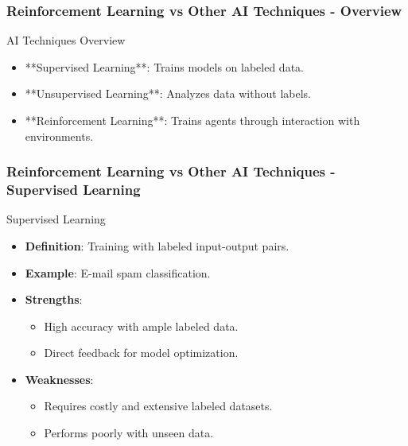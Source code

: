 \documentclass{beamer}
\begin{document}
\begin{frame}[fragile]
    \frametitle{Reinforcement Learning vs Other AI Techniques - Overview}
    \begin{block}{AI Techniques Overview}
        \begin{itemize}
            \item **Supervised Learning**: Trains models on labeled data.
            \item **Unsupervised Learning**: Analyzes data without labels.
            \item **Reinforcement Learning**: Trains agents through interaction with environments.
        \end{itemize}
    \end{block}
\end{frame}

\begin{frame}[fragile]
    \frametitle{Reinforcement Learning vs Other AI Techniques - Supervised Learning}
    \begin{block}{Supervised Learning}
        \begin{itemize}
            \item \textbf{Definition}: Training with labeled input-output pairs.
            \item \textbf{Example}: E-mail spam classification.
            \item \textbf{Strengths}:
                \begin{itemize}
                    \item High accuracy with ample labeled data.
                    \item Direct feedback for model optimization.
                \end{itemize}
            \item \textbf{Weaknesses}:
                \begin{itemize}
                    \item Requires costly and extensive labeled datasets.
                    \item Performs poorly with unseen data.
                \end{itemize}
        \end{itemize}
    \end{block}
\end{frame}
\end{document}
